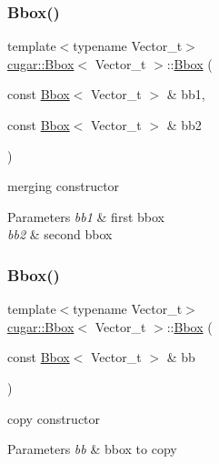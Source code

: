 \subsubsection{\texorpdfstring{Bbox()}{Bbox()}\hspace{0.1cm}{\footnotesize\ttfamily [4/5]}}
{\footnotesize\ttfamily template$<$typename Vector\+\_\+t$>$ \\
\hyperlink{structcugar_1_1_bbox}{cugar\+::\+Bbox}$<$ Vector\+\_\+t $>$\+::\hyperlink{structcugar_1_1_bbox}{Bbox} (\begin{DoxyParamCaption}\item[{const \hyperlink{structcugar_1_1_bbox}{Bbox}$<$ Vector\+\_\+t $>$ \&}]{bb1,  }\item[{const \hyperlink{structcugar_1_1_bbox}{Bbox}$<$ Vector\+\_\+t $>$ \&}]{bb2 }\end{DoxyParamCaption})}

merging constructor


\begin{DoxyParams}{Parameters}
{\em bb1} & first bbox \\
\hline
{\em bb2} & second bbox \\
\hline
\end{DoxyParams}
\mbox{\label{structcugar_1_1_bbox_a7b0f30b0465d422b3b9d92e34bcd679e}} 
\subsubsection{\texorpdfstring{Bbox()}{Bbox()}\hspace{0.1cm}{\footnotesize\ttfamily [5/5]}}
{\footnotesize\ttfamily template$<$typename Vector\+\_\+t$>$ \\
\hyperlink{structcugar_1_1_bbox}{cugar\+::\+Bbox}$<$ Vector\+\_\+t $>$\+::\hyperlink{structcugar_1_1_bbox}{Bbox} (\begin{DoxyParamCaption}\item[{const \hyperlink{structcugar_1_1_bbox}{Bbox}$<$ Vector\+\_\+t $>$ \&}]{bb }\end{DoxyParamCaption})}

copy constructor


\begin{DoxyParams}{Parameters}
{\em bb} & bbox to copy \\
\hline
\end{DoxyParams}


